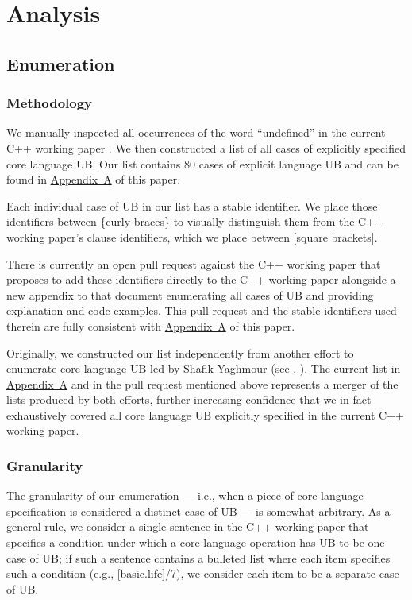 \section{Analysis}
\label{analysis}

\subsection{Enumeration}

\subsubsection{Methodology}

We manually inspected all occurrences of the word ``undefined'' in the current C++ working paper \cite{N5008}. We then constructed a list of all cases of explicitly specified core language UB. Our list contains 80 cases of explicit language UB and can be found in \hyperref[appendix]{Appendix~A} of this paper. 

Each individual case of UB in our list has a stable identifier. We place those identifiers between \{curly braces\} to visually distinguish them from the C++ working paper's clause identifiers, which we place between [square brackets]. 

There is currently an open pull request against the C++ working paper that proposes to add these identifiers directly to the C++ working paper alongside a new appendix to that document enumerating all cases of UB and providing explanation and code examples. This pull request and the stable identifiers used therein are fully consistent with \hyperref[appendix]{Appendix~A} of this paper. 

Originally, we constructed our list independently from another effort to enumerate core language UB led by Shafik Yaghmour (see \cite{P1705R1}, \cite{P3075R0}). The current list in \hyperref[appendix]{Appendix~A} and in the pull request mentioned above represents a merger of the lists produced by both efforts, further increasing confidence that we in fact exhaustively covered all core language UB explicitly specified in the current C++ working paper.

\subsubsection{Granularity}

The granularity of our enumeration --- i.e., when a piece of core language specification is considered a distinct case of UB --- is somewhat arbitrary. As a general rule, we consider a single sentence in the C++ working paper that specifies a condition under which a core language operation has UB to be one case of UB; if such a sentence contains a bulleted list where each item specifies such a condition (e.g., [basic.life]/7), we consider each item to be a separate case of UB.

